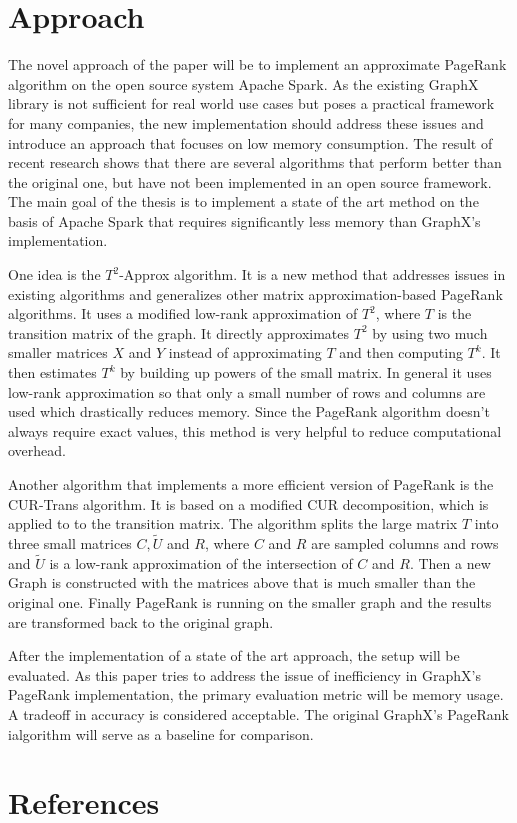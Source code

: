 \documentclass[a4paper,12pt]{article}
\begin{document}
\begin{multicols}{2}
\section{Approach}
The novel approach of the paper will be to implement an approximate PageRank algorithm on the open source system Apache Spark. As the existing GraphX library is not sufficient for real world use cases but poses a practical framework for many companies, the new implementation should address these issues and introduce an approach that focuses on low memory consumption. 
The result of recent research shows that there are several algorithms that perform better than the original one, but have not been implemented in an open source framework. The main goal of the thesis is to implement a state of the art method on the basis of Apache Spark that requires significantly less memory than GraphX's implementation. 

One idea is the $T^2$-Approx algorithm. It is a new method that addresses issues in existing algorithms and generalizes other matrix approximation-based PageRank algorithms. It uses a modified low-rank approximation of $T^2$, where $T$ is the transition matrix of the graph. It directly approximates $T^2$ by using two much smaller matrices $X$ and $Y$ instead of approximating $T$ and then computing $T^k$. It then estimates $T^k$ by building up powers of the small matrix. In general it uses low-rank approximation so that only a small number of rows and columns are used which drastically reduces memory. Since the PageRank algorithm doesn't always require exact values, this method is very helpful to reduce computational overhead.

Another algorithm that implements a more efficient version of PageRank is the CUR-Trans algorithm. It is based on a modified CUR decomposition, which is applied to to the transition matrix. The algorithm splits the large matrix $T$ into three small matrices $C, \tilde{U}$ and $R$, where $C$ and $R$ are sampled columns and rows and $\tilde{U}$ is a low-rank approximation of the intersection of $C$ and $R$. Then a new Graph is constructed with the matrices above that is much smaller than the original one. Finally PageRank is running on the smaller graph and the results are transformed back to the original graph.

After the implementation of a state of the art approach, the setup will be evaluated. As this paper tries to address the issue of inefficiency in GraphX's PageRank implementation, the primary evaluation metric will be memory usage. A tradeoff in accuracy is considered acceptable. The original GraphX's PageRank ialgorithm will serve as a baseline for comparison.



\section{References}

\end{multicols}
\end{document}
